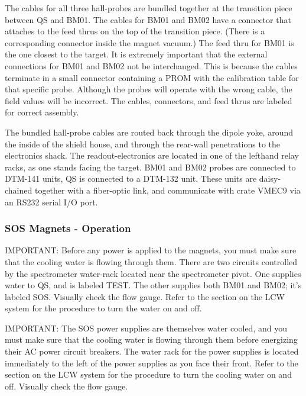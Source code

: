 The cables for all three hall-probes are bundled together at the transition
piece between QS and BM01. The cables for BM01 and BM02 have a connector that
attaches to the feed thrus on the top of the transition piece. (There is a
corresponding connector inside the magnet vacuum.) The feed thru for BM01 is
the one closest to the target. It is extremely important that the external
connections for BM01 and BM02 not be interchanged. This is because the cables
terminate in a small connector containing a PROM with the calibration table for
that specific probe. Although the probes will operate with the wrong cable, the
field values will be incorrect. The cables, connectors, and feed thrus are
labeled for correct assembly.

The bundled hall-probe cables are routed back through the dipole yoke, around
the inside of the shield house, and through the rear-wall penetrations to the
electronics shack. The readout-electronics are located in one of the lefthand
relay racks, as one stands facing the target. BM01 and BM02 probes are connected
to DTM-141 units, QS is connected to a DTM-132 unit. These units are
daisy-chained together with a fiber-optic link, and communicate with crate
VMEC9 via an RS232 serial I/O port.

\subsubsection {SOS Magnets - Operation}

IMPORTANT: Before any power is applied to the magnets, you must make sure that
the cooling water is flowing through them. There are two circuits controlled by
the spectrometer water-rack located near the spectrometer pivot. One supplies
water to QS, and is labeled TEST. The other supplies both BM01 and BM02; it's
labeled SOS. Visually check the flow gauge.
Refer to the section on the LCW system for the procedure to turn the water on and off.

IMPORTANT: The SOS power supplies are themselves water cooled, and you must
make sure that the cooling water is flowing through them before energizing
their AC power circuit breakers. The water rack for the power supplies is
located immediately to the left of the power supplies as you face their front.
Refer to the section on the LCW system for the procedure to turn the cooling water on and off.
Visually check the flow gauge.

